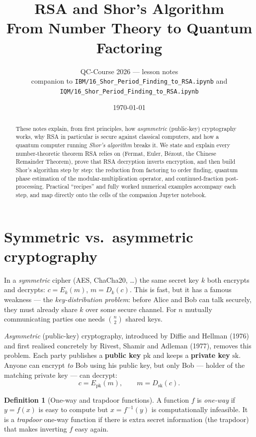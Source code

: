 \documentclass[11pt]{article}
\title{\textbf{RSA and Shor's Algorithm}\\[2pt]
\large From Number Theory to Quantum Factoring}
\author{QC-Course 2026 --- lesson notes\\[2pt]
\small companion to \texttt{IBM/16\_Shor\_Period\_Finding\_to\_RSA.ipynb} and \texttt{IQM/16\_Shor\_Period\_Finding\_to\_RSA.ipynb}}
\date{\today}
\theoremstyle{plain}
\theoremstyle{definition}
\newtheorem{definition}[theorem]{Definition}
\theoremstyle{remark}
\begin{document}
\maketitle

\begin{abstract}
\noindent These notes explain, from first principles, how \emph{asymmetric}
(public-key) cryptography works, why RSA in particular is secure against classical
computers, and how a quantum computer running \emph{Shor's algorithm} breaks it.
We state and explain every number-theoretic theorem RSA relies on (Fermat, Euler,
B\'ezout, the Chinese Remainder Theorem), prove that RSA decryption inverts
encryption, and then build Shor's algorithm step by step: the reduction from
factoring to order finding, quantum phase estimation of the modular-multiplication
operator, and continued-fraction post-processing. Practical ``recipes'' and fully
worked numerical examples accompany each step, and map directly onto the cells of
the companion Jupyter notebook.
\end{abstract}

\tableofcontents
\bigskip

\section{Symmetric vs.\ asymmetric cryptography}

In a \emph{symmetric} cipher (AES, ChaCha20, \dots) the same secret key $k$ both
encrypts and decrypts: $c = E_k(m)$, $m = D_k(c)$. This is fast, but it has a famous
weakness --- the \emph{key-distribution problem}: before Alice and Bob can talk
securely, they must already share $k$ over some secure channel. For $n$ mutually
communicating parties one needs $\binom{n}{2}$ shared keys.

\emph{Asymmetric} (public-key) cryptography, introduced by Diffie and Hellman (1976)
and first realised concretely by Rivest, Shamir and Adleman (1977), removes this
problem. Each party publishes a \textbf{public key} $\mathrm{pk}$ and keeps a
\textbf{private key} $\mathrm{sk}$. Anyone can encrypt \emph{to} Bob using his public
key, but only Bob --- holder of the matching private key --- can decrypt:
\[
  c = E_{\mathrm{pk}}(m), \qquad m = D_{\mathrm{sk}}(c).
\]

\begin{definition}[One-way and trapdoor functions]
A function $f$ is \emph{one-way} if $y=f(x)$ is easy to compute but $x=f^{-1}(y)$ is
computationally infeasible. It is a \emph{trapdoor} one-way function if there is extra
secret information (the trapdoor) that makes inverting $f$ easy again.
\end{definition}
\end{document}
